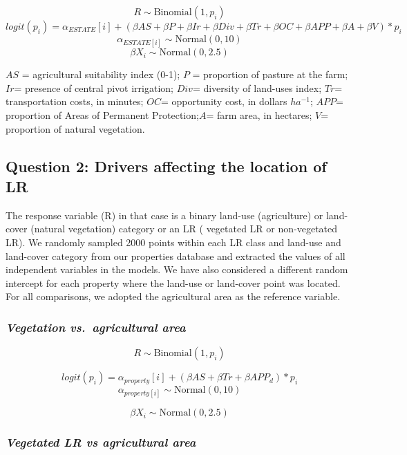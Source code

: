 \documentclass[
	12pt,				%
	oneside,			%
	a4paper,			%
	chapter=TITLE,		%
	section=TITLE,		%
	brazil,			%
	english				%
	]{abntex2}
\begin{document}
\[ R  \sim \text{Binomial}{(1,p_i)}  \]
\[ logit (p_i) = \alpha_{ESTATE}[i] + (\beta{AS} + \beta{P}+\beta{Ir}+\beta{Div}+\beta{Tr}+\beta{OC}+\beta{APP}+\beta{A}+\beta{V})*p_i \]
\[ \alpha_{ESTATE[i]}\sim \text{Normal}{(0,10)} \]
\[ \beta{X_i}\sim \text{Normal}{(0,2.5)}\]

\(AS\) = agricultural suitability index (0-1); \(P\) = proportion of pasture at the farm; \(Ir\)= presence of central pivot irrigation; \(Div\)= diversity of land-uses index; \(Tr\)= transportation costs, in minutes; \(OC\)= opportunity cost, in dollars \(ha^{-1}\); \(APP\)= proportion of Areas of Permanent Protection;\(A\)= farm area, in hectares; \(V\)= proportion of natural vegetation.

\hypertarget{question-2-drivers-affecting-the-location-of-lr}{%
\subsection{Question 2: Drivers affecting the location of LR}\label{question-2-drivers-affecting-the-location-of-lr}}

The response variable (R) in that case is a binary land-use (agriculture) or land-cover (natural vegetation) category or an LR ( vegetated LR or non-vegetated LR). We randomly sampled 2000 points within each LR class and land-use and land-cover category from our properties database and extracted the values of all independent variables in the models. We have also considered a different random intercept for each property where the land-use or land-cover point was located. For all comparisons, we adopted the agricultural area as the reference variable.

\hypertarget{vegetation-vs.-agricultural-area}{%
\subsubsection{\texorpdfstring{\emph{Vegetation vs.~agricultural area}}{Vegetation vs.~agricultural area}}\label{vegetation-vs.-agricultural-area}}

\[ R  \sim \text{Binomial}{(1,p_i)}  \]

\[ logit (p_i) = \alpha_{property}[i] + (\beta{AS} + \beta{Tr}+\beta{APP_d})*p_i \]
\[ \alpha_{property[i]}\sim \text{Normal}{(0,10)} \]

\[ \beta{X_i}\sim \text{Normal}{(0,2.5)}\]

\hypertarget{vegetated-lr-vs-agricultural-area}{%
\subsubsection{\texorpdfstring{\emph{Vegetated LR vs agricultural area}}{Vegetated LR vs agricultural area}}\label{vegetated-lr-vs-agricultural-area}}
\end{document}
